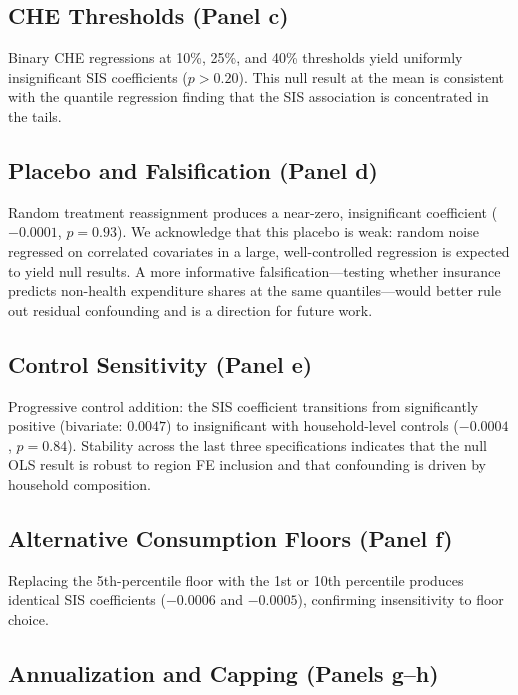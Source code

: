 \subsection{CHE Thresholds (Panel c)}

Binary CHE regressions at 10\%, 25\%, and 40\% thresholds yield uniformly insignificant SIS coefficients ($p > 0.20$). This null result at the mean is consistent with the quantile regression finding that the SIS association is concentrated in the tails.

\subsection{Placebo and Falsification (Panel d)}

Random treatment reassignment produces a near-zero, insignificant coefficient ($-0.0001$, $p = 0.93$). We acknowledge that this placebo is weak: random noise regressed on correlated covariates in a large, well-controlled regression is expected to yield null results. A more informative falsification---testing whether insurance predicts non-health expenditure shares at the same quantiles---would better rule out residual confounding and is a direction for future work.

\subsection{Control Sensitivity (Panel e)}

Progressive control addition: the SIS coefficient transitions from significantly positive (bivariate: $0.0047$) to insignificant with household-level controls ($-0.0004$, $p = 0.84$). Stability across the last three specifications indicates that the null OLS result is robust to region FE inclusion and that confounding is driven by household composition.

\subsection{Alternative Consumption Floors (Panel f)}

Replacing the 5th-percentile floor with the 1st or 10th percentile produces identical SIS coefficients ($-0.0006$ and $-0.0005$), confirming insensitivity to floor choice.

\subsection{Annualization and Capping (Panels g--h)}

